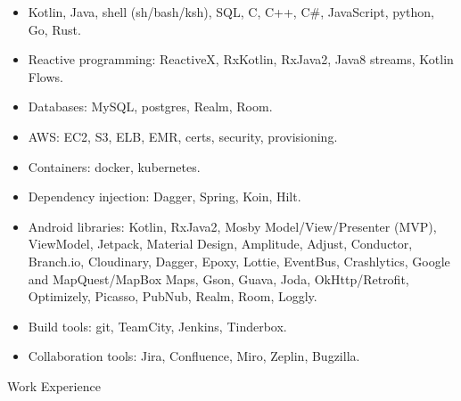 \begin{itemize}
\item Kotlin, Java, shell (sh/bash/ksh), SQL, C, C++, C\#, JavaScript, python, Go, Rust. \\[-18pt]
\item Reactive programming: ReactiveX, RxKotlin, RxJava2, Java8 streams, Kotlin Flows. \\[-18pt]
\item Databases: MySQL, postgres, Realm, Room.  \\[-18pt]
\item AWS: EC2, S3, ELB, EMR, certs, security, provisioning.  \\[-18pt]
\item Containers: docker, kubernetes.  \\[-18pt]
\item Dependency injection: Dagger, Spring, Koin, Hilt.   \\[-18pt]
\item Android libraries:
	Kotlin, RxJava2, Mosby Model/View/Presenter (MVP), ViewModel, Jetpack, Material Design,
	   Amplitude, Adjust, Conductor, Branch.io, Cloudinary, Dagger, Epoxy, Lottie, EventBus, Crashlytics,
	   Google and MapQuest/MapBox Maps, Gson, Guava, Joda, OkHttp/Retrofit, Optimizely, Picasso, PubNub,
	   Realm, Room, Loggly. \\[-18pt]
\item Build tools: git, TeamCity, Jenkins, Tinderbox.   \\[-18pt]
\item Collaboration tools: Jira, Confluence, Miro, Zeplin, Bugzilla.   \\
\end{itemize}


\begin{bf} \large
Work Experience
\end{bf}
\medskip

